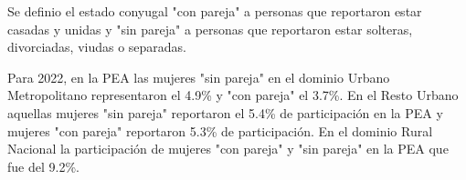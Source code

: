 Se definio el estado conyugal "con pareja" a personas que reportaron estar casadas y unidas y "sin pareja" a personas que reportaron estar solteras, divorciadas, viudas o separadas.  

Para 2022, en la PEA las mujeres "sin pareja" en el dominio Urbano Metropolitano representaron el 4.9\% y "con pareja" el 3.7\%. En el Resto Urbano aquellas mujeres "sin pareja" reportaron el 5.4\% de participación en la PEA y mujeres "con pareja" reportaron 5.3\% de participación. En el dominio Rural Nacional la participación de mujeres "con pareja" y "sin pareja" en la PEA que fue del 9.2\%. 

